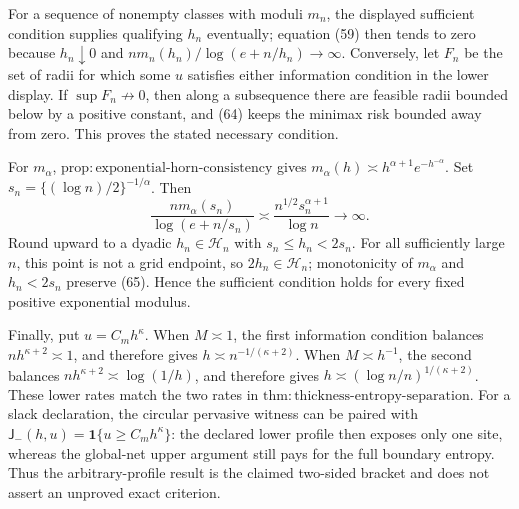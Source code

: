 For a sequence of nonempty classes with moduli \(m_n\), the displayed sufficient condition supplies qualifying \(h_n\) eventually; equation (59) then tends to zero because \(h_n\downarrow0\) and \(nm_n(h_n)/\log(e+n/h_n)\to\infty\). Conversely, let \(F_n\) be the set of radii for which some \(u\) satisfies either information condition in the lower display. If \(\sup F_n\not\to0\), then along a subsequence there are feasible radii bounded below by a positive constant, and (64) keeps the minimax risk bounded away from zero. This proves the stated necessary condition.

For \(m_\alpha\), \(\mathrm{prop:exponential\text{-}horn\text{-}consistency}\) gives \(m_\alpha(h)\asymp h^{\alpha+1}e^{-h^{-\alpha}}\). Set \(s_n=\{(\log n)/2\}^{-1/\alpha}\). Then
\[
 \frac{nm_\alpha(s_n)}{\log(e+n/s_n)}
 \asymp\frac{n^{1/2}s_n^{\alpha+1}}{\log n}\longrightarrow\infty. \tag{65}
\]
Round upward to a dyadic \(h_n\in\mathcal H_n\) with \(s_n\le h_n<2s_n\). For all sufficiently large \(n\), this point is not a grid endpoint, so \(2h_n\in\mathcal H_n\); monotonicity of \(m_\alpha\) and \(h_n<2s_n\) preserve (65). Hence the sufficient condition holds for every fixed positive exponential modulus.

Finally, put \(u=C_mh^\kappa\). When \(M\asymp1\), the first information condition balances \(nh^{\kappa+2}\asymp1\), and therefore gives \(h\asymp n^{-1/(\kappa+2)}\). When \(M\asymp h^{-1}\), the second balances \(nh^{\kappa+2}\asymp\log(1/h)\), and therefore gives \(h\asymp(\log n/n)^{1/(\kappa+2)}\). These lower rates match the two rates in \(\mathrm{thm:thickness\text{-}entropy\text{-}separation}\). For a slack declaration, the circular pervasive witness can be paired with \(\mathsf J_{-}(h,u)=\mathbf1\{u\ge C_mh^\kappa\}\): the declared lower profile then exposes only one site, whereas the global-net upper argument still pays for the full boundary entropy. Thus the arbitrary-profile result is the claimed two-sided bracket and does not assert an unproved exact criterion.
